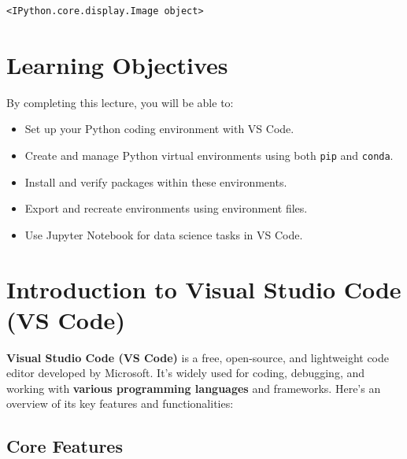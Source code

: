 \documentclass[
  letterpaper,
  DIV=11,
  numbers=noendperiod]{scrreprt}
\providecommand{\tightlist}{%
  \setlength{\itemsep}{0pt}\setlength{\parskip}{0pt}}\usepackage{longtable,booktabs,array}
\begin{document}
\begin{verbatim}
<IPython.core.display.Image object>
\end{verbatim}

\hypertarget{learning-objectives}{%
\section{Learning Objectives}\label{learning-objectives}}

By completing this lecture, you will be able to:

\begin{itemize}
\tightlist
\item
  Set up your Python coding environment with VS Code.\\
\item
  Create and manage Python virtual environments using both \texttt{pip}
  and \texttt{conda}.\\
\item
  Install and verify packages within these environments.\\
\item
  Export and recreate environments using environment files.\\
\item
  Use Jupyter Notebook for data science tasks in VS Code.
\end{itemize}

\hypertarget{introduction-to-visual-studio-code-vs-code}{%
\section{Introduction to Visual Studio Code (VS
Code)}\label{introduction-to-visual-studio-code-vs-code}}

\textbf{Visual Studio Code (VS Code)} is a free, open-source, and
lightweight code editor developed by Microsoft. It's widely used for
coding, debugging, and working with \textbf{various programming
languages} and frameworks. Here's an overview of its key features and
functionalities:

\hypertarget{core-features}{%
\subsection{Core Features}\label{core-features}}
\end{document}
